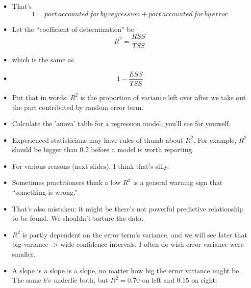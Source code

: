 \documentclass[10pt,english]{beamer}
\def\lyxframeend{} %
\begin{document}
\begin{itemize}
\item That's
\begin{equation}
1=part\, accounted\, for\, by\, regression+part\, accounted\, for\, by\, error
\end{equation}

\end{itemize}

\lyxframeend{}
\begin{itemize}
\item Let the ``coefficient of determination'' be
\[
R^{2}=\frac{RSS}{TSS}
\]

\item which is the same as
\item 
\[
1-\frac{ESS}{TSS}
\]
 
\item Put that in words: $R^{2}$ is the proportion of variance left over
after we take out the part contributed by random error term. 
\item Calculate the 'anova' table for a regression model, you'll see for
yourself.
\end{itemize}

\lyxframeend{}
\begin{itemize}
\item Experienced statisticians may have rules of thumb about $R^{2}$.
For example, $R^{2}$ should be bigger than 0.2 before a model is
worth reporting. 
\item For various reasons (next slides), I think that's silly.
\item Sometimes practitioners think a low $R^{2}$ is a general warning
sign that ``something is wrong.'' 
\item That's also mistaken: it might be there's not powerful predictive
relationship to be found. We shouldn't torture the data.
\item $R^{2}$ is partly dependent on the error term's variance, and we
will see later that big variance -> wide confidence intervals. I often
do wish error variance were smaller. 
\end{itemize}

\lyxframeend{}
\begin{itemize}
\item A slope is a slope is a slope, no matter how big the error variance
might be. The same $b$'s underlie both, but $R^{2}=0.70$ on left
and $0.15$ on right:
\end{itemize}
\end{document}

